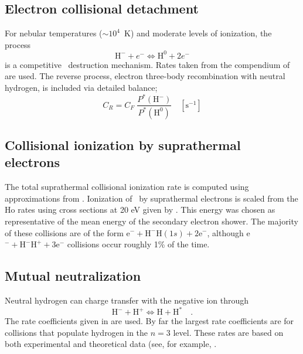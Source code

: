 \subsection{Electron collisional detachment}

For nebular temperatures ($\sim10^4$~K) and moderate levels of ionization,
the process
\begin{equation}
{{\mathrm{H}}^ - } + {e^ - } \Leftrightarrow {{\mathrm{H}}^0} + 2{e^ - }
\end{equation}
is a competitive \hminus\ destruction mechanism.  Rates taken from the compendium
of \citet{Janev1987} are used.  The reverse process, electron three-body
recombination with neutral hydrogen, is included via detailed balance;
\begin{equation}
{C_R} = {C_F}\;\frac{{{P^*}({{\mathrm{H}}^ - })}}{{{P^*}({{\mathrm{H}}^0})}}
\quad [\mathrm{s}^{-1}]
\end{equation}

\subsection{Collisional ionization by suprathermal electrons}

The total suprathermal collisional ionization rate is computed using
approximations from \citet{Shull1985}.  Ionization of \hminus\ by
suprathermal electrons is scaled from the Ho rates using cross sections
at 20 eV given by \citet{Janev1987}.  This energy was chosen as
representative of the mean energy of the secondary electron shower.  The
majority of these collisions are of the form e$^- + \mathrm{H}^- \mathrm{H}(1s) +
2\mathrm{e}^-$, although
e$^- + \mathrm{H}^-  \mathrm{H}^+ + 3\mathrm{e}^-$ collisions occur roughly 1\% of the time.

\subsection{Mutual neutralization}

Neutral hydrogen can charge transfer with the negative ion through
\begin{equation}
{{\mathrm{H}}^ - } + {{\mathrm{H}}^ + } \Leftrightarrow {\mathrm{H}} +
{{\mathrm{H}}^*}\quad .
\end{equation}
The rate coefficients given in \citet{Janev1987} are used.  By far the
largest rate coefficients are for collisions that populate hydrogen in the
$n=3$ level.  These rates are based on both experimental and theoretical data
(see, for example, \citet{Peart1985}.

